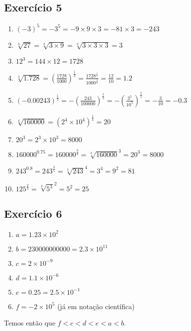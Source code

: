 \subsection*{Exercício 5}

\begin{enumerate}
\item $\left(-3\right)^5 = -3^5 = -9 \times 9 \times 3 = -81 \times 3 = -243$
\item $\sqrt[3]{27} = \sqrt[3]{3 \times 9} = \sqrt[3]{3 \times 3 \times 3} = 3$
\item $12^3 = 144 \times 12 = 1728$
\item $\sqrt[3]{1.728} =
  \left(\frac{1728}{1000}\right)^{\frac{1}{3}} =
  \frac{1728^{\frac{1}{3}}}{1000^{\frac{1}{3}}} =
  \frac{12}{10} = 1.2$
\item $\left(-0.00243\right)^{\frac{1}{5}} =
  -\left(\frac{243}{100000}\right)^{\frac{1}{5}} =
  -\left(\frac{3^5}{10^5}\right)^{\frac{1}{5}} =
  -\frac{3}{10} = -0.3$
\item $\sqrt[4]{160000} = \left(2^4 \times 10^4\right)^{\frac{1}{4}} = 20$
\item $20^3 = 2^3 \times 10^3 = 8000$
\item $160000^{0.75} = 160000^{\frac{3}{4}} = \sqrt[4]{160000}^3 = 20^3 = 8000$
\item $243^{0.8} = 243^{\frac{4}{5}} = \sqrt[5]{243}^4 = 3^4 = 9^2 = 81$
\item $125^{\frac{2}{3}} = \sqrt[3]{5^3}^2 = 5^2 = 25$
\end{enumerate}

\subsection*{Exercício 6}

\begin{enumerate}
\item $a = 1.23 \times 10^2$
\item $b = 230000000000 = 2.3 \times 10^{11}$
\item $c = 2 \times 10^{-9}$
\item $d = 1.1 \times 10^{-6}$
\item $e = 0.25 = 2.5 \times 10^{-1}$
\item $f = -2\times 10^5$ (já em notação científica)
\end{enumerate}

Temos então que $f < c < d < e < a < b$.
